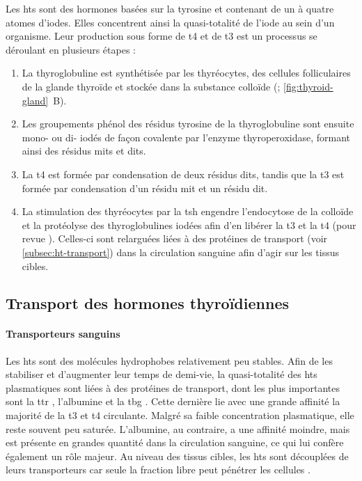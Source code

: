 \documentclass[../main.tex]{subfiles}
\begin{document}
Les \glspl{ht} sont des hormones basées sur la tyrosine et contenant de un à quatre atomes d'iodes.
Elles concentrent ainsi la quasi-totalité de l'iode au sein d'un organisme.
Leur production sous forme de \gls{t4} et de \gls{t3} est un processus se déroulant en plusieurs étapes :
\begin{enumerate}
\item La thyroglobuline est synthétisée par les thyréocytes, des cellules folliculaires de la glande thyroïde et stockée dans la substance colloïde (\citealp{Lissitzky1981}; \autoref{fig:thyroid-gland}~B).
\item Les groupements phénol des résidus tyrosine de la thyroglobuline sont ensuite mono- ou di- iodés de façon covalente par l'enzyme thyroperoxidase, formant ainsi des résidus \glspl{mit} et \glspl{dit}.
\item La \gls{t4} est formée par condensation de deux résidus \glspl{dit}, tandis que la \gls{t3} est formée par condensation d'un résidu \gls{mit} et un résidu \gls{dit}.
\item La stimulation des thyréocytes par la \gls{tsh} engendre l'endocytose de la colloïde et la protéolyse des thyroglobulines iodées afin d'en libérer la \gls{t3} et la \gls{t4} (pour revue \citealp{Rousset2003}).
Celles-ci sont relarguées liées à des protéines de transport (voir \autoref{subsec:ht-transport}) dans la circulation sanguine afin d'agir sur les tissus cibles.
\end{enumerate}


\subsection{Transport des hormones thyroïdiennes}\label{subsec:ht-transport}

\paragraph{Transporteurs sanguins}
Les \glspl{ht} sont des molécules hydrophobes relativement peu stables.
Afin de les stabiliser et d'augmenter leur temps de demi-vie, la quasi-totalité des \glspl{ht} plasmatiques sont liées à des protéines de transport, dont les plus importantes sont la \gls{ttr} \citep{Palha2002}, l'albumine et la \gls{tbg} \citep{Schussler2000}.
Cette dernière lie avec une grande affinité la majorité de la \gls{t3} et \gls{t4} circulante.
Malgré sa faible concentration plasmatique, elle reste souvent peu saturée.
L'albumine, au contraire, a une affinité moindre, mais est présente en grandes quantité dans la circulation sanguine, ce qui lui confère également un rôle majeur.
Au niveau des tissus cibles, les \glspl{ht} sont découplées de leurs transporteurs car seule la fraction libre peut pénétrer les cellules \citep{Ekins1994}.
\end{document}
